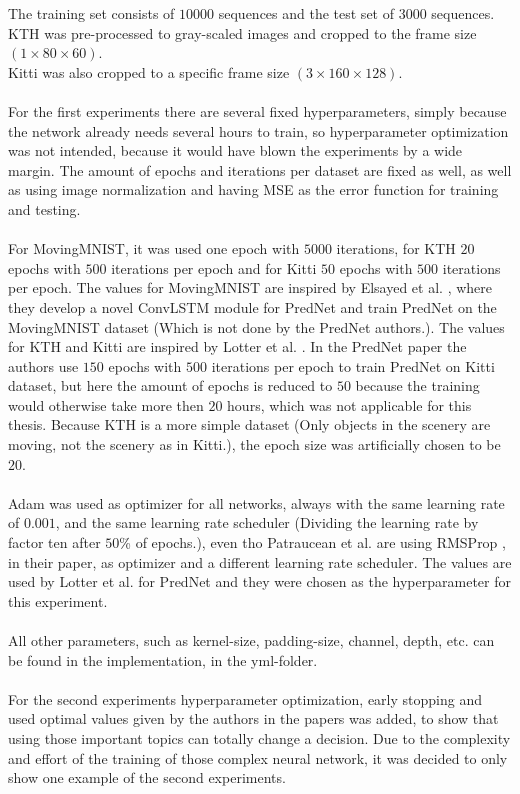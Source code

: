   The training set consists of $10000$ sequences and the test set of $3000$ sequences.\\
  KTH was pre-processed to gray-scaled images and cropped to the frame size $(1 \times 80 \times 60)$.\\
  Kitti was also cropped to a specific frame size $(3 \times 160 \times 128)$.
  \\\\
  For the first experiments there are several fixed hyperparameters, simply because the network already needs several hours to train, so hyperparameter 
  optimization was not intended, because it would have blown the experiments by a wide margin.
  The amount of epochs and iterations per dataset are fixed as well, as well as using image normalization and having MSE as the
  error function for training and testing.
  \\\\
  For MovingMNIST, it was used one epoch with $5000$ iterations, for KTH $20$ epochs with $500$ iterations per epoch and for Kitti $50$ epochs with $500$ 
  iterations per epoch. The values for MovingMNIST are inspired by Elsayed et al. \cite{Elsayed2018}, where they develop a novel ConvLSTM module for PredNet and 
  train PredNet on the MovingMNIST dataset (Which is not done by the PredNet authors.).
  The values for KTH and Kitti are inspired by Lotter et al. \cite{Lotter2016}.
  In the PredNet paper the authors use $150$ epochs with $500$ iterations per epoch to train PredNet on Kitti dataset, but here the amount of epochs is reduced to
  $50$ because the training would otherwise take more then $20$ hours, which was not applicable for this thesis. Because KTH is a more \glqq simple\grqq{} dataset 
  (Only 
  objects in the scenery are moving, not the scenery as in Kitti.), the epoch size was artificially chosen to be $20$.
  \\\\
  Adam \cite{Kingma2015} was used as optimizer for all networks, always with the same learning rate of $0.001$, and the same learning rate scheduler (Dividing the 
  learning rate by factor ten after $50$\% of epochs.), even tho 
  Patraucean et al. \cite{Patraucean2015} are using RMSProp \cite{Ruder2016}, in their paper, as optimizer and a different learning rate scheduler.
  The values are used by Lotter et al. \cite{Lotter2016} for PredNet and they were chosen as the hyperparameter for this experiment.
  \\\\
  All other parameters, such as kernel-size, padding-size, channel, depth, etc. can be found in the implementation, in the yml-folder.  
  \\\\
  For the second experiments hyperparameter optimization, early stopping and used \glqq optimal values\grqq{} given by the authors in the papers was added,
  to show that using those important topics can totally change a decision.
  Due to the complexity and effort of the training of those complex neural network, it was decided to only show one example of the second experiments.
  
